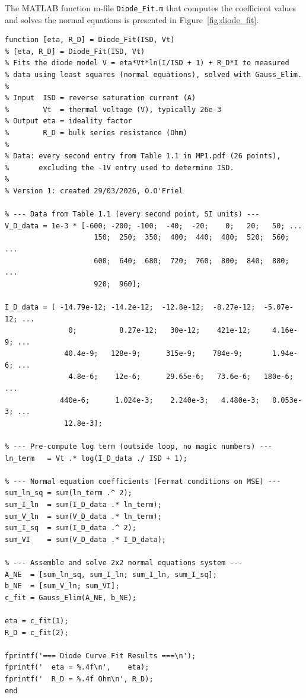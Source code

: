 \documentclass[12pt,a4paper]{article}
\begin{document}
The MATLAB function m-file \texttt{Diode\_Fit.m} that computes the coefficient values and
solves the normal equations is presented in Figure~\ref{fig:diode_fit}.

\begin{lstlisting}[caption={MATLAB function m-file \texttt{Diode\_Fit.m} that computes the
         normal equation coefficients and solves for the diode parameters $\eta$ and $R_D$.},
         label=fig:diode_fit]
function [eta, R_D] = Diode_Fit(ISD, Vt)
% [eta, R_D] = Diode_Fit(ISD, Vt)
% Fits the diode model V = eta*Vt*ln(I/ISD + 1) + R_D*I to measured
% data using least squares (normal equations), solved with Gauss_Elim.
%
% Input  ISD = reverse saturation current (A)
%        Vt  = thermal voltage (V), typically 26e-3
% Output eta = ideality factor
%        R_D = bulk series resistance (Ohm)
%
% Data: every second entry from Table 1.1 in MP1.pdf (26 points),
%       excluding the -1V entry used to determine ISD.
%
% Version 1: created 29/03/2026, O.O'Friel

% --- Data from Table 1.1 (every second point, SI units) ---
V_D_data = 1e-3 * [-600; -200; -100;  -40;  -20;    0;   20;   50; ...
                     150;  250;  350;  400;  440;  480;  520;  560; ...
                     600;  640;  680;  720;  760;  800;  840;  880; ...
                     920;  960];

I_D_data = [ -14.79e-12; -14.2e-12;  -12.8e-12;  -8.27e-12;  -5.07e-12; ...
               0;          8.27e-12;   30e-12;    421e-12;     4.16e-9; ...
              40.4e-9;   128e-9;      315e-9;    784e-9;       1.94e-6; ...
               4.8e-6;    12e-6;      29.65e-6;   73.6e-6;   180e-6; ...
             440e-6;      1.024e-3;    2.240e-3;   4.480e-3;   8.053e-3; ...
              12.8e-3];

% --- Pre-compute log term (outside loop, no magic numbers) ---
ln_term   = Vt .* log(I_D_data ./ ISD + 1);

% --- Normal equation coefficients (Fermat conditions on MSE) ---
sum_ln_sq = sum(ln_term .^ 2);
sum_I_ln  = sum(I_D_data .* ln_term);
sum_V_ln  = sum(V_D_data .* ln_term);
sum_I_sq  = sum(I_D_data .^ 2);
sum_VI    = sum(V_D_data .* I_D_data);

% --- Assemble and solve 2x2 normal equations system ---
A_NE  = [sum_ln_sq, sum_I_ln; sum_I_ln, sum_I_sq];
b_NE  = [sum_V_ln; sum_VI];
c_fit = Gauss_Elim(A_NE, b_NE);

eta = c_fit(1);
R_D = c_fit(2);

fprintf('=== Diode Curve Fit Results ===\n');
fprintf('  eta = %.4f\n',    eta);
fprintf('  R_D = %.4f Ohm\n', R_D);
end
\end{lstlisting}
\end{document}
